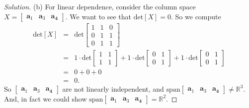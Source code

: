 \documentclass[12pt]{amsart}
\newenvironment{solution}
{\begin{proof}[Solution]}
{\end{proof}}
\begin{document}
\begin{onehalfspace}
\begin{solution}
            (b) For linear dependence, consider the column space
            $X = [\begin{matrix}\mathbf{a}_1 & \mathbf{a}_3 & \mathbf{a_4}\end{matrix}]$. We want to see that $\text{det}[X] = 0$.
            So we compute
            \begin{eqnarray*}
                \text{det}[X] & = &
                \text{det}\left[\begin{matrix}
                                    1 & 1 & 0 \\
                                    0 & 1 & 1 \\
                                    0 & 1 & 1
                \end{matrix}\right] \\
                & = & 1\cdot\text{det}\left[\begin{matrix}
                                                1 & 1\\
                                                1 & 1
                \end{matrix}\right] +
                1\cdot\text{det}\left[\begin{matrix}
                                          0 & 1\\
                                          0 & 1
                \end{matrix}\right] +
                1\cdot\text{det}\left[\begin{matrix}
                                          0 & 1\\
                                          0 & 1
                \end{matrix}\right] \\
                & = & 0 + 0 + 0 \\
                & = & 0.
            \end{eqnarray*}
            So $[\begin{matrix}\mathbf{a}_1 & \mathbf{a}_3 & \mathbf{a_4}\end{matrix}]$ are not linearly independent,
            and $\text{span}[\begin{matrix}\mathbf{a}_1 & \mathbf{a}_3 & \mathbf{a_4}\end{matrix}] \neq \mathbb{R}^3$. And,
            in fact we could show
            $\text{span}[\begin{matrix}\mathbf{a}_1 & \mathbf{a}_3 & \mathbf{a_4}\end{matrix}] = \mathbb{R}^2$.
        \end{solution}
    \end{onehalfspace}
\end{document}
